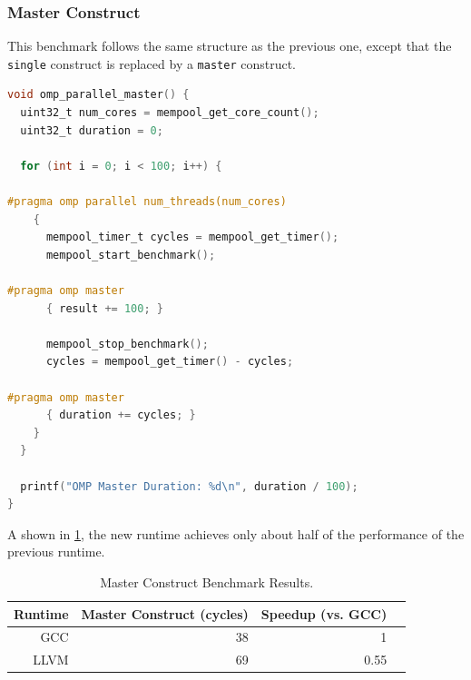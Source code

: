 \subsubsection{Master Construct}

This benchmark follows the same structure as the previous one, except that the \texttt{single}
construct is replaced by a \texttt{master} construct.

\begin{lstlisting}[language=C, caption={Master Benchmark},
                   label={lst:benchmark-master}]
void omp_parallel_master() {
  uint32_t num_cores = mempool_get_core_count();
  uint32_t duration = 0;

  for (int i = 0; i < 100; i++) {

#pragma omp parallel num_threads(num_cores)
    {
      mempool_timer_t cycles = mempool_get_timer();
      mempool_start_benchmark();

#pragma omp master
      { result += 100; }

      mempool_stop_benchmark();
      cycles = mempool_get_timer() - cycles;

#pragma omp master
      { duration += cycles; }
    }
  }

  printf("OMP Master Duration: %d\n", duration / 100);
}
\end{lstlisting}

A shown in \cref{tbl:master}, the new runtime achieves only about half of the performance of the
previous runtime.

\begin{table}[h]
	\centerfloat
	\begin{tabular}{ r r r r }
		\toprule
		\textbf{Runtime} & \textbf{Master Construct (cycles)} & \textbf{Speedup (vs. GCC)} \\
		\midrule
		GCC              & 38                                 & 1                          \\
		LLVM             & 69                                 & 0.55                       \\
		\bottomrule
	\end{tabular}
	\caption{Master Construct Benchmark Results.}%
	\label{tbl:master}
\end{table}

